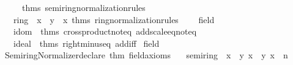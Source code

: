 \begin{isabellebody}
\ \ \ \ \ \ {\isacharat}{\kern0pt}{\isacharbraceleft}{\kern0pt}thms\ semiring{\isacharunderscore}{\kern0pt}normalization{\isacharunderscore}{\kern0pt}rules{\isacharbraceright}{\kern0pt}{\isacharparenright}{\kern0pt}{\isacharcomma}{\kern0pt}\isanewline
\ \ \ \ ring\ {\isacharequal}{\kern0pt}\ {\isacharparenleft}{\kern0pt}{\isacharbrackleft}{\kern0pt}\isactrlterm {\isasymopen}x\ {\isacharminus}{\kern0pt}\ y{\isasymclose}{\isacharcomma}{\kern0pt}\ \isactrlterm {\isasymopen}{\isacharminus}{\kern0pt}\ x{\isasymclose}{\isacharbrackright}{\kern0pt}{\isacharcomma}{\kern0pt}\ {\isacharat}{\kern0pt}{\isacharbraceleft}{\kern0pt}thms\ ring{\isacharunderscore}{\kern0pt}normalization{\isacharunderscore}{\kern0pt}rules{\isacharbraceright}{\kern0pt}{\isacharparenright}{\kern0pt}{\isacharcomma}{\kern0pt}\isanewline
\ \ \ \ field\ {\isacharequal}{\kern0pt}\ {\isacharparenleft}{\kern0pt}{\isacharbrackleft}{\kern0pt}{\isacharbrackright}{\kern0pt}{\isacharcomma}{\kern0pt}\ {\isacharbrackleft}{\kern0pt}{\isacharbrackright}{\kern0pt}{\isacharparenright}{\kern0pt}{\isacharcomma}{\kern0pt}\isanewline
\ \ \ \ idom\ {\isacharequal}{\kern0pt}\ {\isacharat}{\kern0pt}{\isacharbraceleft}{\kern0pt}thms\ crossproduct{\isacharunderscore}{\kern0pt}noteq\ add{\isacharunderscore}{\kern0pt}scale{\isacharunderscore}{\kern0pt}eq{\isacharunderscore}{\kern0pt}noteq{\isacharbraceright}{\kern0pt}{\isacharcomma}{\kern0pt}\isanewline
\ \ \ \ ideal\ {\isacharequal}{\kern0pt}\ {\isacharat}{\kern0pt}{\isacharbraceleft}{\kern0pt}thms\ right{\isacharunderscore}{\kern0pt}minus{\isacharunderscore}{\kern0pt}eq\ add{\isacharunderscore}{\kern0pt}{}{\isacharunderscore}{\kern0pt}iff{\isacharbraceright}{\kern0pt}{\isacharbraceright}{\kern0pt}\isanewline
{\isacartoucheclose}%
\endisatagML
{\isafoldML}%
%
\isadelimML
\isanewline
%
\endisadelimML
\isanewline
{}\isamarkupfalse%
\isanewline
\isanewline
{}\isamarkupfalse%
\ field\isanewline
{}\isanewline
%
\isadelimML
\isanewline
%
\endisadelimML
%
\isatagML
{}\isamarkupfalse%
\ {\isacartoucheopen}\isanewline
\ \ Semiring{\isacharunderscore}{\kern0pt}Normalizer{\isachardot}{\kern0pt}declare\ {\isacharat}{\kern0pt}{\isacharbraceleft}{\kern0pt}thm\ field{\isacharunderscore}{\kern0pt}axioms{\isacharbraceright}{\kern0pt}\isanewline
\ \ \ {\isacharbraceleft}{\kern0pt}semiring\ {\isacharequal}{\kern0pt}\ {\isacharparenleft}{\kern0pt}{\isacharbrackleft}{\kern0pt}\isactrlterm {\isasymopen}x\ {\isacharplus}{\kern0pt}\ y{\isasymclose}{\isacharcomma}{\kern0pt}\ \isactrlterm {\isasymopen}x\ {\isacharasterisk}{\kern0pt}\ y{\isasymclose}{\isacharcomma}{\kern0pt}\ \isactrlterm {\isasymopen}x\ {\isacharcircum}{\kern0pt}\ n{\isasymclose}{\isacharcomma}{\kern0pt}\ \ \isanewline

\end{isabellebody}
